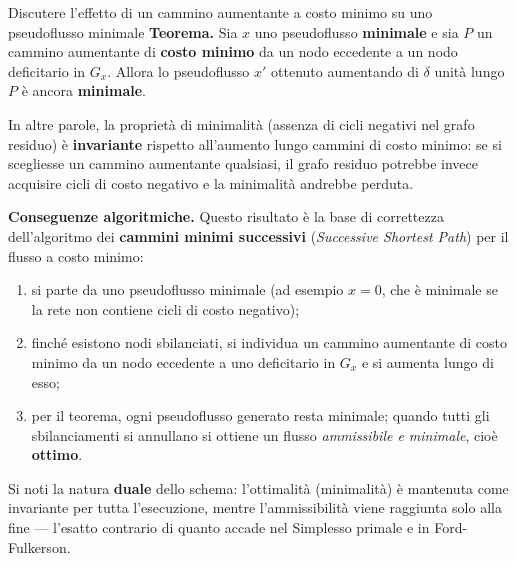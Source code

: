 \documentclass[12pt]{extarticle} %
\begin{document}
\begin{teoriabox}{Discutere l'effetto di un cammino aumentante a costo minimo su uno pseudoflusso minimale}
\textbf{Teorema.} Sia $x$ uno pseudoflusso \textbf{minimale} e sia $P$ un cammino aumentante di \textbf{costo minimo} da un nodo eccedente a un nodo deficitario in $G_x$. Allora lo pseudoflusso $x'$ ottenuto aumentando di $\delta$ unità lungo $P$ è ancora \textbf{minimale}.

\noindent In altre parole, la proprietà di minimalità (assenza di cicli negativi nel grafo residuo) è \textbf{invariante} rispetto all'aumento lungo cammini di costo minimo: se si scegliesse un cammino aumentante qualsiasi, il grafo residuo potrebbe invece acquisire cicli di costo negativo e la minimalità andrebbe perduta.

\noindent\textbf{Conseguenze algoritmiche.} Questo risultato è la base di correttezza dell'algoritmo dei \textbf{cammini minimi successivi} (\textit{Successive Shortest Path}) per il flusso a costo minimo:
\begin{enumerate}
    \item si parte da uno pseudoflusso minimale (ad esempio $x = 0$, che è minimale se la rete non contiene cicli di costo negativo);
    \item finché esistono nodi sbilanciati, si individua un cammino aumentante di costo minimo da un nodo eccedente a uno deficitario in $G_x$ e si aumenta lungo di esso;
    \item per il teorema, ogni pseudoflusso generato resta minimale; quando tutti gli sbilanciamenti si annullano si ottiene un flusso \textit{ammissibile e minimale}, cioè \textbf{ottimo}.
\end{enumerate}
Si noti la natura \textbf{duale} dello schema: l'ottimalità (minimalità) è mantenuta come invariante per tutta l'esecuzione, mentre l'ammissibilità viene raggiunta solo alla fine — l'esatto contrario di quanto accade nel Simplesso primale e in Ford-Fulkerson.
\end{teoriabox}
\end{document}
